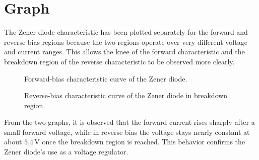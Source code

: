 \section{Graph}

The Zener diode characteristic has been plotted separately for the forward and reverse bias regions because the two regions operate over very different voltage and current ranges. This allows the knee of the forward characteristic and the breakdown region of the reverse characteristic to be observed more clearly.

\begin{figure}[H]
  \centering
  \caption{Forward-bias characteristic curve of the Zener diode.}
  \label{fig:lab06_forward_curve}
\end{figure}

\begin{figure}[H]
  \centering
  \caption{Reverse-bias characteristic curve of the Zener diode in breakdown region.}
  \label{fig:lab06_reverse_curve}
\end{figure}

From the two graphs, it is observed that the forward current rises sharply after a small forward voltage, while in reverse bias the voltage stays nearly constant at about $5.4\,\text{V}$ once the breakdown region is reached. This behavior confirms the Zener diode's use as a voltage regulator.
